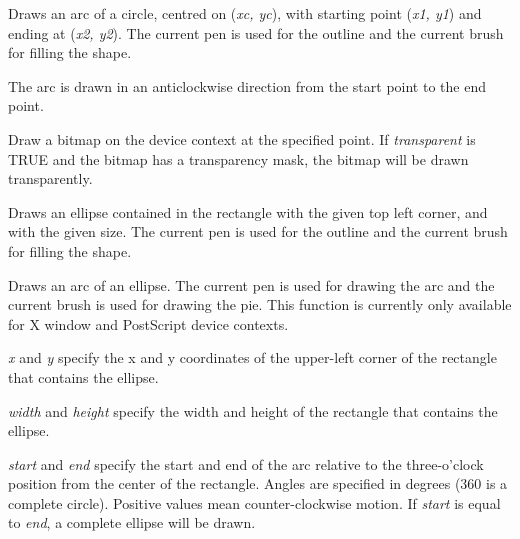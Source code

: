 \label{wxdcdrawarc}


Draws an arc of a circle, centred on ({\it xc, yc}), with starting point ({\it x1, y1})
and ending at ({\it x2, y2}).   The current pen is used for the outline
and the current brush for filling the shape.

The arc is drawn in an anticlockwise direction from the start point to the end point.

\label{wxdcdrawbitmap}


Draw a bitmap on the device context at the specified point. If {\it transparent} is TRUE and the bitmap has
a transparency mask, the bitmap will be drawn transparently.

\label{wxdcdrawellipse}


Draws an ellipse contained in the rectangle with the given top left corner, and with the
given size.  The current pen is used for the outline and the current brush for
filling the shape.

\label{wxdcdrawellipticarc}


Draws an arc of an ellipse. The current pen is used for drawing the arc and 
the current brush is used for drawing the pie. This function is currently only available for
X window and PostScript device contexts.

{\it x} and {\it y} specify the x and y coordinates of the upper-left corner of the rectangle that contains
the ellipse.

{\it width} and {\it height} specify the width and height of the rectangle that contains 
the ellipse.

{\it start} and {\it end} specify the start and end of the arc relative to the three-o'clock
position from the center of the rectangle. Angles are specified
in degrees (360 is a complete circle). Positive values mean
counter-clockwise motion. If {\it start} is equal to {\it end}, a
complete ellipse will be drawn.

